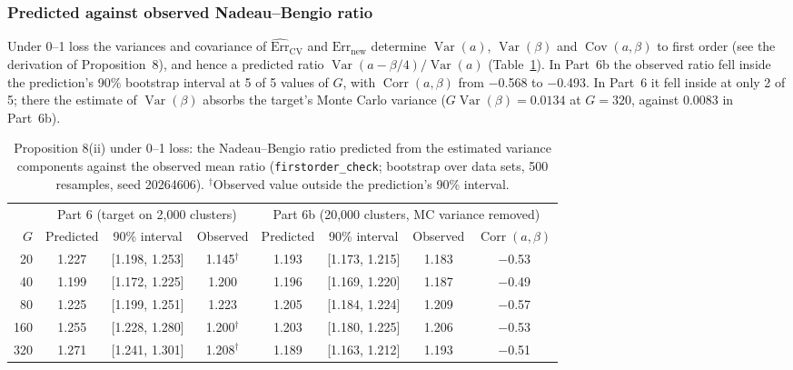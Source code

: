 \documentclass[11pt]{amsart}
\theoremstyle{plain}
\theoremstyle{definition}
\theoremstyle{remark}
\newcommand{\Var}{\operatorname{Var}}
\newcommand{\Cov}{\operatorname{Cov}}
\newcommand{\Corr}{\operatorname{Corr}}
\newcommand{\CV}{\widehat{\mathrm{Err}}_{\mathrm{CV}}}
\newcommand{\Errnew}{\mathrm{Err}_{\mathrm{new}}}
\begin{document}
\subsubsection*{Predicted against observed Nadeau--Bengio ratio} Under 0--1 loss the variances and covariance of $\CV$ and $\Errnew$ determine $\Var(a)$, $\Var(\beta)$ and $\Cov(a,\beta)$ to first order (see the derivation of Proposition~8), and hence a predicted ratio $\Var(a-\beta/4)/\Var(a)$ (Table~\ref{tab:nbpred}). In Part~6b the observed ratio fell inside the prediction's 90\% bootstrap interval at 5 of 5 values of $G$, with $\Corr(a,\beta)$ from $-$0.568 to $-$0.493. In Part~6 it fell inside at only 2 of 5; there the estimate of $\Var(\beta)$ absorbs the target's Monte Carlo variance ($G\Var(\beta)=0.0134$ at $G=320$, against 0.0083 in Part~6b).

\begin{table}[tbp]
\centering\footnotesize
\caption{Proposition 8(ii) under 0--1 loss: the Nadeau--Bengio ratio predicted from the estimated variance components against the observed mean ratio (\texttt{firstorder\_check}; bootstrap over data sets, 500 resamples, seed 20264606). $^{\dagger}$Observed value outside the prediction's 90\% interval.}\label{tab:nbpred}
\begin{tabular}{@{}r c c c c c c c@{}}
\toprule
 & \multicolumn{3}{c}{Part 6 (target on 2,000 clusters)} & \multicolumn{4}{c}{Part 6b (20,000 clusters, MC variance removed)}\\
\cmidrule(lr){2-4}\cmidrule(l){5-8}
$G$ & Predicted & 90\% interval & Observed & Predicted & 90\% interval & Observed & $\Corr(a,\beta)$\\
\midrule
20 & 1.227 & [1.198, 1.253] & 1.145$^{\dagger}$ & 1.193 & [1.173, 1.215] & 1.183 & $-$0.53 \\
40 & 1.199 & [1.172, 1.225] & 1.200 & 1.196 & [1.169, 1.220] & 1.187 & $-$0.49 \\
80 & 1.225 & [1.199, 1.251] & 1.223 & 1.205 & [1.184, 1.224] & 1.209 & $-$0.57 \\
160 & 1.255 & [1.228, 1.280] & 1.200$^{\dagger}$ & 1.203 & [1.180, 1.225] & 1.206 & $-$0.53 \\
320 & 1.271 & [1.241, 1.301] & 1.208$^{\dagger}$ & 1.189 & [1.163, 1.212] & 1.193 & $-$0.51 \\
\bottomrule
\end{tabular}
\end{table}
\end{document}

